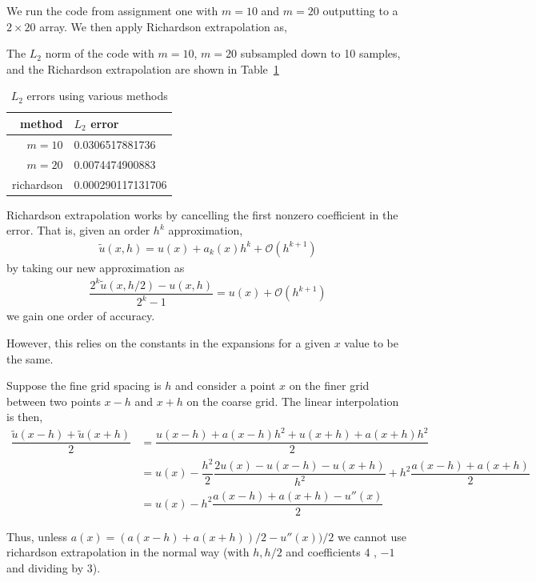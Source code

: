 \documentclass[10pt]{article}
\begin{document}
\begin{solution}[Solution]

We run the code from assignment one with \( m=10 \) and \( m=20 \) outputting to a \( 2\times 20 \) array. We then apply Richardson extrapolation as,


The \( L_2 \) norm of the code with \( m=10 \), \( m=20 \) subsampled down to 10 samples, and the Richardson extrapolation are shown in Table~\ref{richardson}
    \begin{table}[H]\centering
    \begin{tabular}{|r|l|} \hline
        method & \( L_2 \) error \\ \hline \hline
        \( m = 10 \) & 0.0306517881736 \\ \hline
        \( m = 20 \) & 0.0074474900883 \\ \hline
        richardson & 0.000290117131706 \\ \hline
    \end{tabular}
    \caption{\(L_2\) errors using various methods}
    \label{richardson}
\end{table}

Richardson extrapolation works by cancelling the first nonzero coefficient in the error. That is, given an order \( h^k \) approximation, 
\begin{align*}
    \tilde{u}(x,h) = u(x) + a_k(x)h^k + \mathcal{O}(h^{k+1})
\end{align*}
by taking our new approximation as
\begin{align*}
    \dfrac{2^k \tilde{u}(x,h/2) - u(x,h)}{2^k-1} = u(x) + \mathcal{O}(h^{k+1})
\end{align*}
we gain one order of accuracy.

However, this relies on the constants in the expansions for a given \( x \) value to be the same.

Suppose the fine grid spacing is \( h \) and consider a point \( x \) on the finer grid between two points \( x-h \) and \( x+h \) on the coarse grid. The linear interpolation is then,
\begin{align*}
    \dfrac{\tilde{u}(x-h) + \tilde{u}(x+h)}{2} &= \dfrac{u(x-h)+a(x-h)h^2+u(x+h)+a(x+h)h^2}{2} \\
    &= u(x) - \dfrac{h^2}{2} \dfrac{2u(x) - u(x-h) - u(x+h)}{h^2} + h^2\dfrac{a(x-h)+a(x+h)}{2} \\
    &= u(x) - h^2 \dfrac{a(x-h)+a(x+h) - u''(x)}{2}
\end{align*}

Thus, unless \( a(x) = (a(x-h)+a(x+h))/2-u''(x))/2 \) we cannot use richardson extrapolation in the normal way (with \( h, h/2 \) and coefficients \( 4 \) , \( -1 \) and dividing by 3).


\end{solution}
\end{document}
